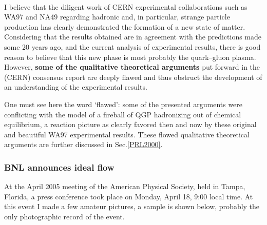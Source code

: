 \\[-0.7cm]
%
\begin{mdframed}[linecolor=gray,roundcorner=12pt,backgroundcolor=Dandelion!15,linewidth=1pt,leftmargin=0cm,rightmargin=0cm,topline=true,bottomline=true,skipabove=12pt]
\relax
%
I believe that the diligent work of CERN experimental collaborations such as WA97
and NA49 regarding hadronic and, in particular, strange particle production has clearly demonstrated the formation of a new state of matter. Considering that the results obtained are in agreement with the predictions made some 20 years ago, and the current analysis of experimental results, there is good reason to believe that this new phase is most probably the quark–gluon plasma. However, \textbf{some of the qualitative theoretical arguments} put forward in the (CERN) consensus report  are deeply flawed and thus obstruct the development of an understanding of the experimental results.  
%
\end{mdframed}
\vskip 0.5cm

One must see here the word  \lq flawed\rq: some of the presented  arguments were  conflicting  with the model of a fireball of QGP hadronizing out of chemical equilibrium, a reaction picture as clearly favored then and now by these original and beautiful WA97 experimental results. These flowed qualitative theoretical arguments are further discussed in Sec.\ref{PRL2000}.


\subsubsection{BNL announces ideal flow}\label{ssec:flow}
At the April 2005 meeting of the American Physical Society, held in Tampa, Florida, a press conference took place on Monday, April 18, 9:00 local time. At this event I made a few amateur pictures, a sample is shown below, probably the only photographic record of the event.\\

